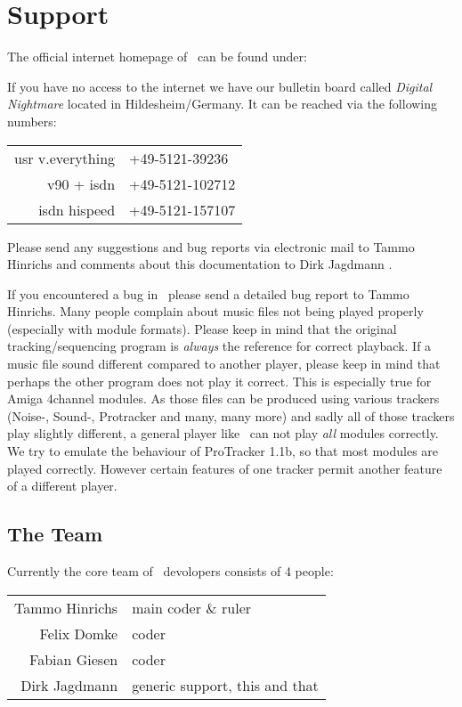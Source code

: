 %
%

\chapter{Support}
\label{homepage}
The official internet homepage of \cp\ can be found under:
\begin{center}
\textbf{}
\end{center}
If you have no access to the internet we have our bulletin board called
\emph{Digital Nightmare} located in Hildesheim/Germany. It can be reached via
the following numbers:
\begin{center}
\begin{tabular}{rl}
usr v.everything & +49-5121-39236 \\
v90 + isdn & +49-5121-102712 \\
isdn hispeed & +49-5121-157107 \\
\end{tabular}
\end{center}

Please send any suggestions and bug reports via electronic mail to Tammo
Hinrichs \textbf{} and comments about
this documentation to Dirk Jagdmann \textbf{}.

If you encountered a bug in \cp\ please send
a detailed bug report to Tammo Hinrichs. Many people complain about music
files not being played properly (especially with module formats). Please keep
in mind that the original tracking/sequencing program is \emph{always} the
reference for correct playback. If a music file sound different compared to
another player, please keep in mind that perhaps the other program does not
play it correct. This is especially true for Amiga 4channel modules. As those
files can be produced using various trackers (Noise-, Sound-, Protracker and
many, many more) and sadly all of those trackers play slightly different, a
general player like \cp\ can not play \emph{all} modules correctly. We try to
emulate the behaviour of ProTracker 1.1b, so that most modules are
played correctly. However certain features of one tracker permit another
feature of a different player.

\section{The Team}
Currently the core team of \cp\ devolopers consists of 4 people:

\begin{tabular}{r@{\quad-\quad}l}
Tammo Hinrichs & main coder \& ruler \\
Felix Domke & coder \\
Fabian Giesen & coder \\
Dirk Jagdmann & generic support, this and that \\
\end{tabular}
